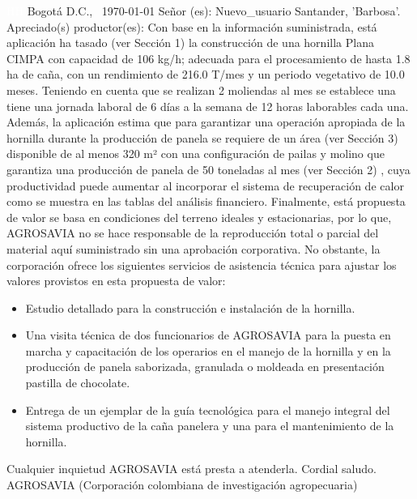 \documentclass{article}%
\begin{document}
\begin{large}%
\textcolor{white}{ 
HH
}%
\linebreak%
Bogotá D.C., %
\ {\today}%
\newline%
 \newline%
%
\linebreak%
\newline%
Señor (es):%
\newline%
Nuevo\_usuario%
\newline%
Santander,  'Barbosa'.%
\newline%
 \newline%
%
\newline%
Apreciado(s) productor(es):%
\newline%
 \newline%
%
Con base en la información suministrada, está aplicación ha tasado (ver Sección 1) la construcción de una hornilla Plana CIMPA con capacidad de 106 kg/h; adecuada para el procesamiento de hasta 1.8 ha de caña, con un rendimiento de 216.0 T/mes y un periodo vegetativo de 10.0 meses. Teniendo en cuenta que se realizan 2 moliendas al mes se establece una tiene una jornada laboral de 6 días a la semana de 12 horas laborables cada una. \newline%
 Además, la aplicación estima que para garantizar una operación apropiada de la hornilla durante la producción de panela se requiere de un área (ver Sección 3) disponible de al menos 320 m² con una configuración de pailas y molino que garantiza una producción de panela de 50 toneladas al mes (ver Sección 2)%
, cuya productividad puede aumentar al incorporar el sistema de recuperación de calor como se muestra en las tablas del análisis financiero.%
\newline%
 Finalmente, está propuesta de valor se basa en condiciones del terreno ideales y estacionarias, por lo que, AGROSAVIA no se hace responsable de la reproducción total o parcial del material aquí suministrado sin una aprobación corporativa. No obstante, la corporación ofrece los siguientes servicios de asistencia técnica para ajustar los valores provistos en esta propuesta de valor:%
\begin{itemize}%
\item%
Estudio detallado para la construcción e instalación de la hornilla.%
\item%
Una visita técnica de dos funcionarios de AGROSAVIA para la puesta en marcha y capacitación de los operarios en el manejo de la hornilla y en la producción de panela saborizada, granulada o moldeada en presentación pastilla de chocolate.%
\item%
Entrega de un ejemplar de la guía tecnológica para el manejo integral del sistema productivo de la caña panelera y una para el mantenimiento de la hornilla.%
\end{itemize}%
Cualquier inquietud AGROSAVIA está presta a atenderla.\newline%
Cordial saludo.\newline%
\newline%
 \newline%
 \newline%
 \newline%
AGROSAVIA (Corporación colombiana de investigación agropecuaria)%
\end{large}%
\end{document}
